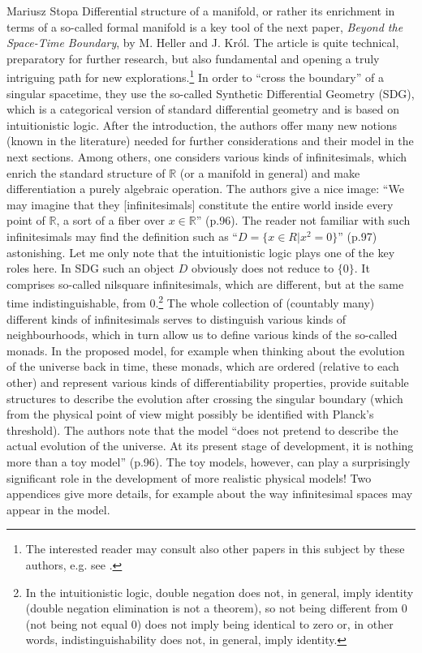 \begin{recengenv}{Mariusz Stopa}
Differential structure of a manifold, or rather its enrichment in terms of a so-called formal manifold is a key tool of the next paper, \textit{Beyond the Space-Time Boundary}, by M. Heller and J. Król. The article is quite technical, preparatory for further research, but also fundamental and opening a truly intriguing path for new explorations.\footnote{The interested reader may consult also other papers in this subject by these authors, e.g. see \parencite{heller-krol-2016, heller-krol-2017}.} In order to ``cross the boundary'' of a singular spacetime, they use the so-called Synthetic Differential Geometry (SDG), which is a cat\-e\-go\-rical version of standard differential geometry and is based on intuitionistic logic. After the introduction, the authors offer many new notions (known in the literature) needed for further considerations and their model in the next sections. Among others, one considers various kinds of infinitesimals, which enrich the standard structure of $ \mathbb{R} $ (or a manifold in general) and make differentiation a purely algebraic operation. The authors give a nice image: ``We may imagine that they [infinitesimals] constitute the entire world inside every point of $ \mathbb{R} $, a sort of a fiber over $ x\in\mathbb{R} $'' (p.96). The reader not familiar with such infinitesimals may find the definition such as ``$ D=\{x\in R | x^2=0\} $'' (p.97) astonishing. Let me only note that the intuitionistic logic plays one of the key roles here. In SDG such an object $ D $ obviously does not reduce to $ \{0\} $. It comprises so-called nilsquare infinitesimals, which are different, but at the same time indistinguishable, from $ 0 $.\footnote{In the intuitionistic logic, double negation does not, in general, imply identity (double negation elimination is not a theorem), so not being different from $ 0 $ (not being not equal $ 0 $) does not imply being identical to zero or, in other words, indistinguishability does not, in general, imply identity.} The whole collection of (countably many) different kinds of infinitesimals serves to distinguish various kinds of neighbourhoods, which in turn allow us to define various kinds of the so-called monads. In the proposed model, for example when thinking about the evolution of the universe back in time, these monads, which are ordered (relative to each other) and represent various kinds of differentiability properties, provide suitable structures to describe the evolution after crossing the singular boundary (which from the physical point of view might possibly be identified with Planck's threshold). The authors note that the model ``does not pretend to describe the actual evolution of the universe. At its present stage of development, it is nothing more than a toy model'' (p.96). The toy models, however, can play a surprisingly significant role in the development of more realistic physical models! Two appendices give more details, for example about the way infinitesimal spaces may appear in the model.


\end{recengenv}
